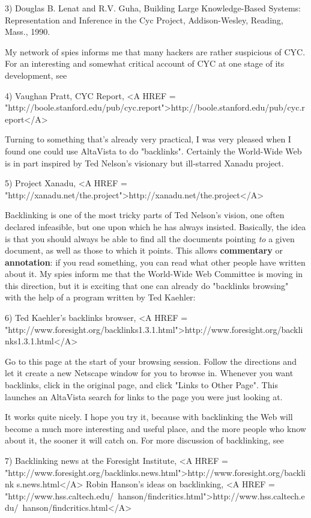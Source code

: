 3) Douglas B. Lenat and R.V. Guha, Building Large Knowledge-Based Systems: 
Representation and Inference in the Cyc Project, Addison-Wesley, Reading,
Mass., 1990.


  My network of spies informs me that many hackers are rather
suspicious of CYC.  
For an interesting and somewhat critical account of CYC at one stage of its
development, see

4) Vaughan Pratt, CYC Report,
<A HREF =
"http://boole.stanford.edu/pub/cyc.report">http://boole.stanford.edu/pub/cyc.report</A>

Turning to something that's already very practical, I was very pleased
when I found one could use AltaVista to do "backlinks".  Certainly the
World-Wide Web is in part inspired by Ted Nelson's visionary but
ill-starred Xanadu project.

5) Project Xanadu, <A HREF = "http://xanadu.net/the.project">http://xanadu.net/the.project</A>

Backlinking is one of the most tricky parts of Ted Nelson's vision, one
often declared infeasible, but one upon which he has always insisted.
Basically, the idea is that you should always be able to find all the
documents pointing \emph{to} a given document, as well as those to which
it points.  This allows \textbf{commentary} or \textbf{annotation}: if you read
something, you can read what other people have written about it. 
My spies inform me that the World-Wide Web Committee is moving in this
direction, but it is exciting that one can already do "backlinks
browsing" with the help of a program written by Ted Kaehler:

6) Ted Kaehler's backlinks browser,
<A HREF =
"http://www.foresight.org/backlinks1.3.1.html">http://www.foresight.org/backlinks1.3.1.html</A>

Go to this page at the start of your browsing session.  Follow the
directions and let it create a new Netscape window for you to browse in.
Whenever you want backlinks, click in the original page, and click
"Links to Other Page". This launches an AltaVista search for links to
the page you were just looking at.

It works quite nicely.  I hope you try it, because with backlinking the
Web will become a much more interesting and useful place, and the more
people who know about it, the sooner it will catch on.  For more
discussion of backlinking, see

7) Backlinking news at the Foresight Institute,
<A HREF =
"http://www.foresight.org/backlinks.news.html">http://www.foresight.org/backlink
s.news.html</A>
Robin Hanson's ideas on backlinking,
<A HREF = "http://www.hss.caltech.edu/~hanson/findcritics.html">http://www.hss.caltech.edu/~hanson/findcritics.html</A>

